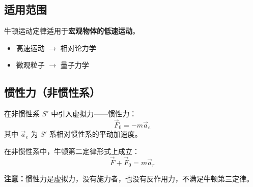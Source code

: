 \documentclass{ctexart}
\begin{document}
\subsection*{适用范围}
牛顿运动定律适用于\textbf{宏观物体的低速运动}。
\begin{itemize}
  \item 高速运动 $\to$ 相对论力学
  \item 微观粒子 $\to$ 量子力学
\end{itemize}

\subsection*{惯性力（非惯性系）}
在非惯性系 $S'$ 中引入虚拟力——惯性力：
\[
\vec{F}_0 = -m\vec{a}_e
\]
其中 $\vec{a}_e$ 为 $S'$ 系相对惯性系的平动加速度。

在非惯性系中，牛顿第二定律形式上成立：
\[
\vec{F} + \vec{F}_0 = m\vec{a}_r
\]

\textbf{注意：}惯性力是虚拟力，没有施力者，也没有反作用力，不满足牛顿第三定律。
\end{document}
